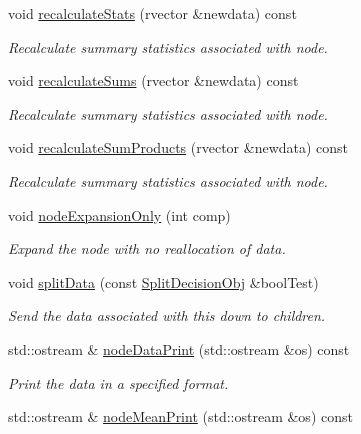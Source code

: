 \begin{DoxyCompactItemize}
\item 
void \hyperlink{classsubpavings_1_1SPSnode_a8011280b8a3a0729c581a00f3bb031ff}{recalculate\-Stats} (rvector \&newdata) const 
\begin{DoxyCompactList}\small\item\em \-Recalculate summary statistics associated with node. \end{DoxyCompactList}\item 
void \hyperlink{classsubpavings_1_1SPSnode_aa70c978a273b7266c75e7d617ae4d100}{recalculate\-Sums} (rvector \&newdata) const 
\begin{DoxyCompactList}\small\item\em \-Recalculate summary statistics associated with node. \end{DoxyCompactList}\item 
void \hyperlink{classsubpavings_1_1SPSnode_ab49e57afe0939b41930e0cbb22c9ba8a}{recalculate\-Sum\-Products} (rvector \&newdata) const 
\begin{DoxyCompactList}\small\item\em \-Recalculate summary statistics associated with node. \end{DoxyCompactList}\item 
void \hyperlink{classsubpavings_1_1SPSnode_ac549870ef3b7994d9e87b952a012a7e9}{node\-Expansion\-Only} (int comp)
\begin{DoxyCompactList}\small\item\em \-Expand the node with no reallocation of data. \end{DoxyCompactList}\item 
void \hyperlink{classsubpavings_1_1SPSnode_adf3d76ca267b87c46d1fcb1ca3cecd84}{split\-Data} (const \hyperlink{classsubpavings_1_1SplitDecisionObj}{\-Split\-Decision\-Obj} \&bool\-Test)
\begin{DoxyCompactList}\small\item\em \-Send the data associated with this down to children. \end{DoxyCompactList}\item 
std\-::ostream \& \hyperlink{classsubpavings_1_1SPSnode_a799dd8e194518c3dd525ecba26072585}{node\-Data\-Print} (std\-::ostream \&os) const 
\begin{DoxyCompactList}\small\item\em \-Print the data in a specified format. \end{DoxyCompactList}\item 
std\-::ostream \& \hyperlink{classsubpavings_1_1SPSnode_a5f5cc02f707a2b98f7a93543c71298b2}{node\-Mean\-Print} (std\-::ostream \&os) const 

\end{DoxyCompactItemize}
